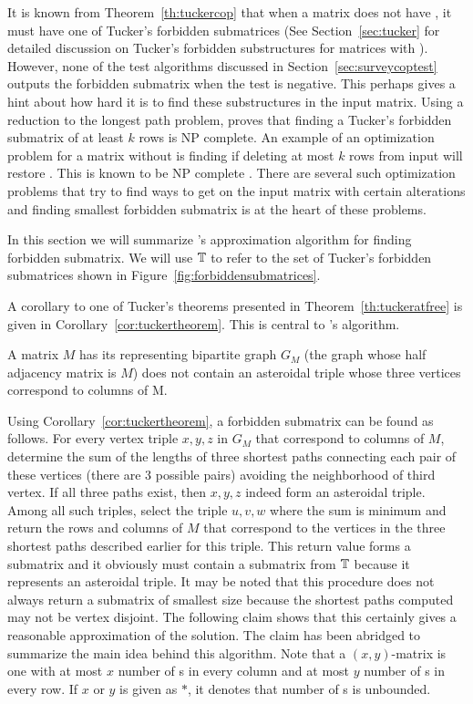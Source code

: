 It is known from Theorem~\ref{th:tuckercop} that when a matrix does
not have \COP, it must have one of Tucker's forbidden submatrices (See
Section~\ref{sec:tucker} for detailed discussion on Tucker's forbidden
substructures for matrices with \COP). However, none of the \COP test
algorithms discussed in Section~\ref{sec:surveycoptest} outputs the
forbidden submatrix when the test is negative. This perhaps gives a
hint about how hard it is to find these substructures in the input
matrix. Using a reduction to the longest path problem, \cite{v85}
proves that finding a Tucker's forbidden submatrix of at least $k$
rows is NP complete. An example of an optimization problem for a
matrix without \COP is finding if deleting at most $k$ rows from input
will restore \COP. This is known to be NP complete
\cite{b75-phd}. There are several such optimization problems that try
to find ways to get \COP on the input matrix with certain alterations
and finding smallest forbidden submatrix is at the heart of these problems.


In this section we will summarize \cite{d08phd}'s approximation
algorithm for finding forbidden submatrix. We will use $\mathbb{T}$ to
refer to the set of Tucker's forbidden submatrices shown in
Figure~\ref{fig:forbiddensubmatrices}.


A corollary to one of Tucker's theorems presented in
Theorem~\ref{th:tuckeratfree} is given in
Corollary~\ref{cor:tuckertheorem}. This is central to \cite{d08phd}'s
algorithm.

\begin{corollary}
  \label{cor:tuckertheorem}
  A matrix $M$ has \COP \iff its representing bipartite graph $G_M$
  (the graph whose half adjacency matrix is $M$) does not contain an
  asteroidal triple whose three vertices correspond to columns of M.
\end{corollary}

Using Corollary~\ref{cor:tuckertheorem}, a forbidden submatrix can be
found as follows. For every vertex triple $x, y, z$ in $G_M$ that
correspond to columns of $M$, determine the sum of the lengths of
three shortest paths connecting each pair of these vertices (there are
3 possible pairs) avoiding the neighborhood of third vertex. If all
three paths exist, then $x, y, z$ indeed form an asteroidal
triple. Among all such triples, select the triple $u, v, w$ where the
sum is minimum and return the rows and columns of $M$ that correspond
to the vertices in the three shortest paths described earlier for this triple. This
return value forms a submatrix and it obviously must contain a
submatrix from $\mathbb{T}$ because it represents an asteroidal
triple. It may be noted that this procedure does not always return a
submatrix of smallest size because the shortest paths computed may not
be vertex disjoint. The following claim shows that this certainly
gives a reasonable approximation of the solution. The claim has been
abridged to summarize the main idea behind this algorithm.
Note that a $(x,y)$-matrix is one with at most $x$ number of {\un}s in every
column and at most $y$ number of {\un}s in every row. If $x$ or $y$ is given as
$*$, it denotes that number of {\un}s is unbounded.

